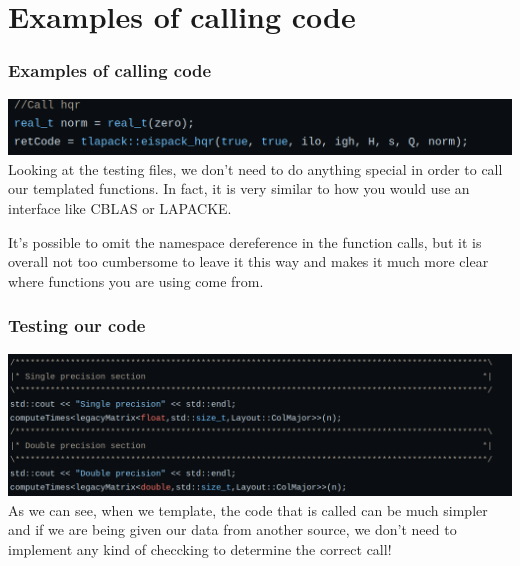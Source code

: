 \documentclass[12pt]{beamer}
\begin{document}
    \section{Examples of calling code}
    \begin{frame}
        \frametitle{Examples of calling code}
        \includegraphics[width=\textwidth]{images/callingHqr.png}
        Looking at the testing files, we don't need to do anything special in order to call our templated
        functions. In fact, it is very similar to how you would use an interface like CBLAS or LAPACKE.

        It's possible to omit the namespace dereference in the function calls, but it is overall not too
        cumbersome to leave it this way and makes it much more clear where functions you are using come from.
    \end{frame}
    \begin{frame}
        \frametitle{Testing our code}
        \includegraphics[width=\textwidth]{images/numericalExperiments.png}
        As we can see, when we template, the code that is called can be much simpler and if we are being given
        our data from another source, we don't need to implement any kind of checcking to determine the correct
        call!
    \end{frame}
\end{document}
